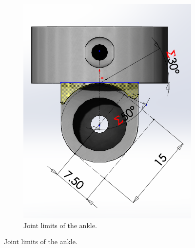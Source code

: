 \begin{figure}[ht!]
\begin{subfigure}[b]{0.35\textwidth}
        \includegraphics[width=\textwidth]{figures/joint_limits_ankle_upper.PNG}
        \caption{Joint limits of the ankle.}
        \label{fig:joint_limits_ankle_upper}
    \end{subfigure}
\end{figure}    

